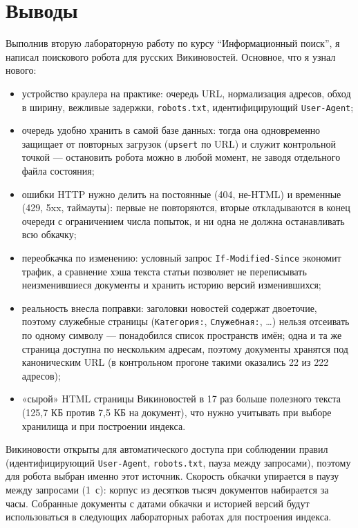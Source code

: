 \pagebreak
\section{Выводы}
Выполнив вторую лабораторную работу по курсу \enquote{Информационный поиск}, я
написал поискового робота для русских Викиновостей. Основное, что я узнал
нового:

\begin{itemize}
    \item устройство краулера на практике: очередь URL, нормализация адресов,
    обход в ширину, вежливые задержки, \texttt{robots.txt}, идентифицирующий
    \texttt{User-Agent};
    \item очередь удобно хранить в самой базе данных: тогда она одновременно
    защищает от повторных загрузок (\texttt{upsert} по URL) и служит
    контрольной точкой --- остановить робота можно в любой момент, не заводя
    отдельного файла состояния;
    \item ошибки HTTP нужно делить на постоянные (404, не-HTML) и временные
    (429, 5xx, таймауты): первые не повторяются, вторые откладываются в конец
    очереди с ограничением числа попыток, и ни одна не должна останавливать
    всю обкачку;
    \item переобкачка по изменению: условный запрос \texttt{If-Modified-Since}
    экономит трафик, а сравнение хэша текста статьи позволяет не переписывать
    неизменившиеся документы и хранить историю версий изменившихся;
    \item реальность внесла поправки: заголовки новостей содержат двоеточие,
    поэтому служебные страницы (\texttt{Категория:}, \texttt{Служебная:}, \dots)
    нельзя отсеивать по одному символу --- понадобился список пространств
    имён; одна и та же страница доступна по нескольким адресам, поэтому
    документы хранятся под каноническим URL (в контрольном прогоне такими
    оказались 22 из 222 адресов);
    \item «сырой» HTML страницы Викиновостей в 17 раз больше полезного текста
    (125{,}7 КБ против 7{,}5 КБ на документ), что нужно учитывать при выборе
    хранилища и при построении индекса.
\end{itemize}

Викиновости открыты для автоматического доступа при соблюдении
правил (идентифицирующий \texttt{User-Agent}, \texttt{robots.txt}, пауза между
запросами), поэтому для робота выбран именно этот источник. Скорость обкачки
упирается в паузу между запросами (1~с): корпус из десятков тысяч документов
набирается за часы. Собранные документы с датами обкачки и историей версий
будут использоваться в следующих лабораторных работах для построения индекса.

\pagebreak
